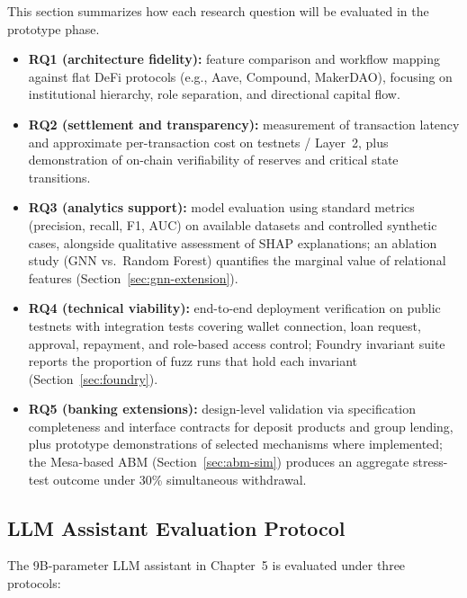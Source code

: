 \documentclass[12pt,a4paper]{report}
\begin{document}
This section summarizes how each research question will be evaluated in the prototype phase.
\begin{itemize}[noitemsep]
\item \textbf{RQ1 (architecture fidelity):} feature comparison and workflow mapping against flat DeFi protocols (e.g., Aave, Compound, MakerDAO), focusing on institutional hierarchy, role separation, and directional capital flow.
\item \textbf{RQ2 (settlement and transparency):} measurement of transaction latency and approximate per-transaction cost on testnets / Layer~2, plus demonstration of on-chain verifiability of reserves and critical state transitions.
\item \textbf{RQ3 (analytics support):} model evaluation using standard metrics (precision, recall, F1, AUC) on available datasets and controlled synthetic cases, alongside qualitative assessment of SHAP explanations; an ablation study (GNN vs.\ Random Forest) quantifies the marginal value of relational features (Section~\ref{sec:gnn-extension}).
\item \textbf{RQ4 (technical viability):} end-to-end deployment verification on public testnets with integration tests covering wallet connection, loan request, approval, repayment, and role-based access control; Foundry invariant suite reports the proportion of fuzz runs that hold each invariant (Section~\ref{sec:foundry}).
\item \textbf{RQ5 (banking extensions):} design-level validation via specification completeness and interface contracts for deposit products and group lending, plus prototype demonstrations of selected mechanisms where implemented; the Mesa-based ABM (Section~\ref{sec:abm-sim}) produces an aggregate stress-test outcome under 30\% simultaneous withdrawal.
\end{itemize}

\subsection{LLM Assistant Evaluation Protocol}
\label{sec:llm-eval}

The 9B-parameter LLM assistant in Chapter~5 is evaluated under three protocols:
\end{document}
